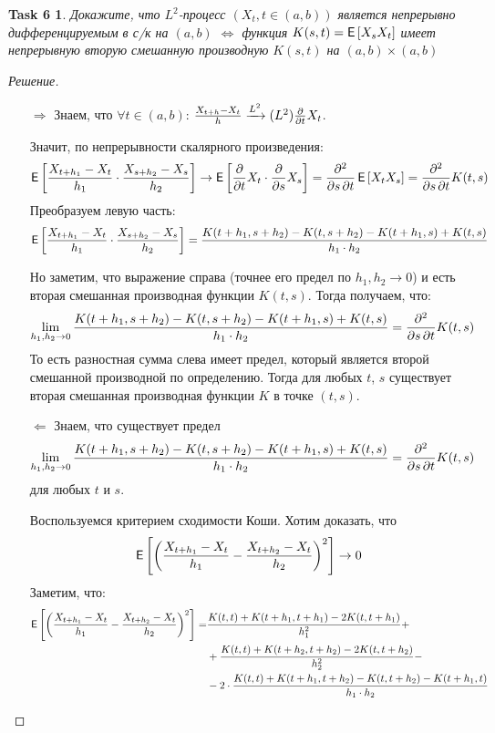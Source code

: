 \documentclass[12pt,a4paper]{extarticle}
\newtheorem*{task6}{Task 6}
\renewcommand*\dd{\mathop{}\!\partial}
\newcommand{\ps}{\xrightarrow{L^2}}
\newcommand{\ra}{\rightarrow}
\begin{document}
	
	
	
	
	
\vspace{\baselineskip}


\begin{task6}
	Докажите, что $L^2$-процесс $(X_t , t \in (a, b))$ является непрерывно дифференцируемым в с/к на $(a, b)$ $\Leftrightarrow$ функция $K(s, t) = \E{X_s X_t}$ имеет непрерывную вторую смешанную производную ${} K(s, t)$ на $(a, b) \times (a, b)$
\end{task6}
\begin{proof}[Решение]
	\
	\begin{itemize}
		\item[$\Rightarrow$] Знаем, что $\forall t \in (a, b)$: ${X_{t + h} - X_t \over h} \ps (L^2) {\dd \over \dd t} X_t$.
		
		Значит, по непрерывности скалярного произведения: 
		\[
			\E{{X_{t + h_1} - X_t \over h_1} \cdot {X_{s + h_2} - X_s \over h_2}} \ra \E{{\dd \over \dd t} X_t \cdot {\dd \over \dd s} X_s} 
			=
			{\dd^2 \over \dd s \dd t} \E{X_t X_s} = {\dd^2 \over \dd s \dd t} K(t, s)
		\]
		Преобразуем левую часть:
		\[
			\E{{X_{t + h_1} - X_t \over h_1} \cdot {X_{s + h_2} - X_s \over h_2}} = {K(t + h_1, s + h_2) - K(t, s + h_2) - K(t + h_1, s) + K(t, s) \over h_1 \cdot h_2}
		\]
		
		Но заметим, что выражение справа (точнее его предел по $h_1, h_2 \ra 0$) и есть вторая смешанная производная функции $K(t, s)$. Тогда получаем, что:
		\[
			\lim_{h_1, h_2 \ra 0}{K(t + h_1, s + h_2) - K(t, s + h_2) - K(t + h_1, s) + K(t, s) \over h_1 \cdot h_2} = {\dd^2 \over \dd s \dd t} K(t, s)
		\]
		То есть разностная сумма слева имеет предел, который является второй смешанной производной по определению. Тогда для любых $t$, $s$ существует вторая смешанная производная функции $K$ в точке $(t, s)$.
		
		\item[$\Leftarrow$] Знаем, что существует предел
		\[
			\lim_{h_1, h_2 \ra 0} {K(t + h_1, s + h_2) - K(t, s + h_2) - K(t + h_1, s) + K(t, s) \over h_1 \cdot h_2} = {\dd^2 \over \dd s \dd t} K(t, s)
		\]
		для любых $t$ и $s$.
		
		Воспользуемся критерием сходимости Коши. Хотим доказать, что 
		\[
			\E{\left( {X_{t + h_1} - X_t \over h_1} - {X_{t + h_2} - X_t \over h_2} \right)^2} \ra 0
		\]
		Заметим, что:
		\begin{align}
			\E{\left( {X_{t + h_1} - X_t \over h_1} - {X_{t + h_2} - X_t \over h_2} \right)^2} 
			=& {K(t, t) + K(t + h_1, t + h_1) - 2 K(t, t + h_1) \over h_1^2} +
			\\
			&+  {K(t, t) + K(t + h_2, t + h_2) - 2 K(t, t + h_2) \over h_2^2} -
			\\
			& - 2 \cdot {K(t, t) + K(t + h_1, t + h_2) - K(t, t + h_2) - K(t + h_1, t) \over h_1 \cdot h_2}
		\end{align}
		

\end{itemize}
\end{proof}
\end{document}
